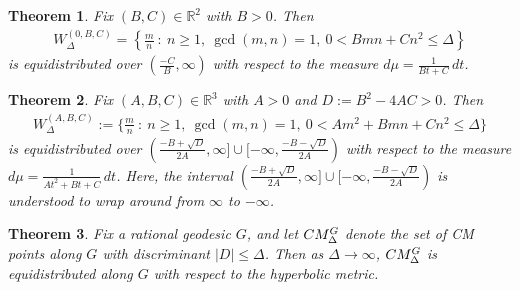 \documentclass[10pt,a4paper]{amsart}
\newtheorem{theorem}{Theorem}
\newcommand{\CM}{\textnormal{CM}}
\newcommand{\RR}{\mathbb{R}}
\newcommand{\lrcb}[1]{\left\{#1\right\}}
\begin{document}
\begin{theorem} 
    \label{thm:equid-W--A=0,B>0}
    Fix $(B,C) \in \RR^2$ with $B > 0$. Then
    \begin{align}
        W_{\Delta}^{(0,B,C)} = \lrcb{\frac{m}{n}  ~:~ n\ge1,~ \gcd(m,n)=1,~ 0 < B mn + C n^2 \le \Delta} 
    \end{align} 
    is equidistributed over $(\frac{-C}{B},\infty)$ with respect to the measure $d\mu = \frac{1}{Bt+C} \,dt$.
\end{theorem}

\begin{theorem} \label{thm:equid-W--A>0,D>0}
Fix $(A,B,C) \in \RR^3$ with $A > 0$ and $D := B^2-4AC > 0$. Then
\begin{align}
    W_{\Delta}^{(A,B,C)} := \Big\{\frac{m}{n} ~:~ n\ge 1,~ \gcd(m,n)=1,~   0 < A m^2 + B mn + C n^2  \le \Delta
    \Big\}
\end{align}
is equidistributed over $(\frac{-B+\sqrt{D}}{2A},\infty] \cup [-\infty,\frac{-B-\sqrt{D}}{2A})$ with respect to the measure $d\mu = \frac{1}{At^2+Bt+C} \,dt$. Here, the interval $(\frac{-B+\sqrt{D}}{2A},\infty] \cup [-\infty,\frac{-B-\sqrt{D}}{2A})$ is understood to wrap around from $\infty$ to $-\infty$.
\end{theorem}

\begin{theorem} \label{thm:equid-CM-geodesic}
    Fix a rational geodesic $G$, and let 
    $\CM^{G}_{\Delta}$ denote the set of CM points along $G$ with discriminant $|D| \le \Delta$. 
    Then as $\Delta \to \infty$, $\CM^{G}_{\Delta}$ is equidistributed along $G$ with respect to the hyperbolic metric.
\end{theorem}
\end{document}
